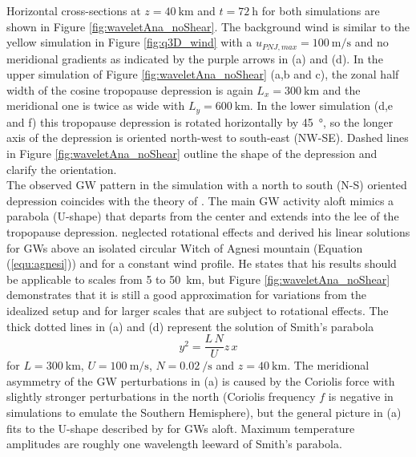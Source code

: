 Horizontal cross-sections at $z=\SI{40}{\kilo\meter}$ and $t=\SI{72}{\hour}$ for both simulations are shown in Figure \ref{fig:waveletAna_noShear}. The background wind is similar to the yellow simulation in Figure \ref{fig:q3D_wind} with a $u_{PNJ,max}=\SI{100}{\meter\per\second}$ and no meridional gradients as indicated by the purple arrows in (a) and (d). In the upper simulation of Figure \ref{fig:waveletAna_noShear} (a,b and c), the zonal half width of the cosine tropopause depression is again $L_x=\SI{300}{\kilo\meter}$ and the meridional one is twice as wide with $L_y=\SI{600}{\kilo\meter}$. In the lower simulation (d,e and f) this tropopause depression is rotated horizontally by \SI{45}{\degree}, so the longer axis of the depression is oriented north-west to south-east (NW-SE). Dashed lines in Figure \ref{fig:waveletAna_noShear} outline the shape of the depression and clarify the orientation. \\
The observed GW pattern in the simulation with a north to south (N-S) oriented depression coincides with the theory of \textcite[]{smith_linear_1980}. The main GW activity aloft mimics a parabola (U-shape) that departs from the center and extends into the lee of the tropopause depression. \textcite[]{smith_linear_1980} neglected rotational effects and derived his linear solutions for GWs above an isolated circular Witch of Agnesi mountain (Equation (\ref{equ:agnesi})) and for a constant wind profile. He states that his results should be applicable to scales from 5 to \SI{50}{\kilo\meter}, but Figure \ref{fig:waveletAna_noShear} demonstrates that it is still a good approximation for variations from the idealized setup and for larger scales that are subject to rotational effects. The thick dotted lines in (a) and (d) represent the solution of Smith's parabola
\begin{equation}
    y^2 = \frac{L \, N}{U} z \, x
    \label{equ:smith_parabola}
\end{equation}
for $L=\SI{300}{\kilo\meter}$, $U=\SI{100}{\meter\per\second}$, $N=\SI{0.02}{\per\second}$ and $z=\SI{40}{\kilo\meter}$. The meridional asymmetry of the GW perturbations in (a) is caused by the Coriolis force with slightly stronger perturbations in the north (Coriolis frequency $f$ is negative in simulations to emulate the Southern Hemisphere), but the general picture in (a) fits to the U-shape described by \textcite[]{smith_linear_1980} for GWs aloft. Maximum temperature amplitudes are roughly one wavelength leeward of Smith's parabola. \\
